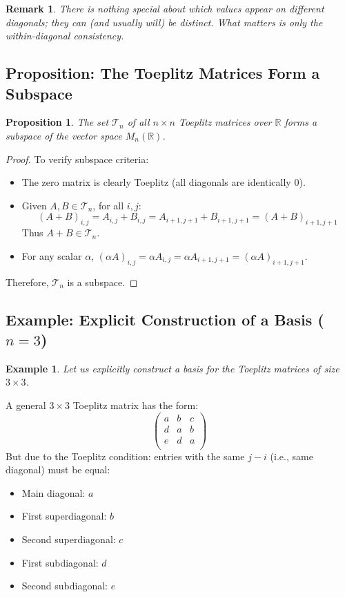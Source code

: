 \documentclass[12pt]{article}
\newtheorem{proposition}[theorem]{Proposition}
\newtheorem{remark}[theorem]{Remark}
\newtheorem{example}[theorem]{Example}
\begin{document}
\begin{remark}
There is nothing special about which values appear on different diagonals; they can (and usually will) be distinct. What matters is only the within-diagonal consistency.
\end{remark}

\subsection{Proposition: The Toeplitz Matrices Form a Subspace}

\begin{proposition}
The set $\mathcal{T}_n$ of all $n \times n$ Toeplitz matrices over $\mathbb{R}$ forms a subspace of the vector space $M_n(\mathbb{R})$.
\end{proposition}

\begin{proof}
To verify subspace criteria:

\begin{itemize}
    \item The zero matrix is clearly Toeplitz (all diagonals are identically $0$).
    \item Given $A,B \in \mathcal{T}_n$, for all $i,j$:
    \[
    (A+B)_{i,j} = A_{i,j} + B_{i,j} = A_{i+1,j+1} + B_{i+1,j+1} = (A+B)_{i+1,j+1}
    \]
    Thus $A+B \in \mathcal{T}_n$.
    \item For any scalar $\alpha$, $(\alpha A)_{i,j} = \alpha A_{i,j} = \alpha A_{i+1,j+1} = (\alpha A)_{i+1,j+1}$.
\end{itemize}
Therefore, $\mathcal{T}_n$ is a subspace.
\end{proof}

\subsection{Example: Explicit Construction of a Basis ($n=3$)}

\begin{example}
Let us explicitly construct a basis for the Toeplitz matrices of size $3 \times 3$.
\end{example}

A general $3 \times 3$ Toeplitz matrix has the form:
\[
\begin{pmatrix}
a & b & c \\
d & a & b \\
e & d & a \\
\end{pmatrix}
\]
But due to the Toeplitz condition: entries with the same $j-i$ (i.e., same diagonal) must be equal:
\begin{itemize}
    \item Main diagonal: $a$
    \item First superdiagonal: $b$
    \item Second superdiagonal: $c$
    \item First subdiagonal: $d$
    \item Second subdiagonal: $e$
\end{itemize}
\end{document}
